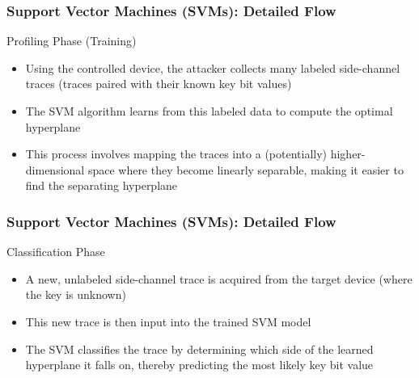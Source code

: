 \begin{frame}
    \frametitle{Support Vector Machines (SVMs): Detailed Flow}
    \begin{block}{Profiling Phase (Training)}
        \begin{itemize}
            \item Using the controlled device, the attacker collects many labeled side-channel traces (traces paired with their known key bit values)
            \item The SVM algorithm learns from this labeled data to compute the optimal hyperplane
            \item This process involves mapping the traces into a (potentially) higher-dimensional space where they become linearly separable, making it easier to find the separating hyperplane
        \end{itemize}
    \end{block}
\end{frame}
\begin{frame}
\frametitle{Support Vector Machines (SVMs): Detailed Flow}
    \begin{block}{Classification Phase}
        \begin{itemize}
            \item A new, unlabeled side-channel trace is acquired from the target device (where the key is unknown)
            \item This new trace is then input into the trained SVM model
            \item The SVM classifies the trace by determining which side of the learned hyperplane it falls on, thereby predicting the most likely key bit value
        \end{itemize}
    \end{block}
\end{frame}
